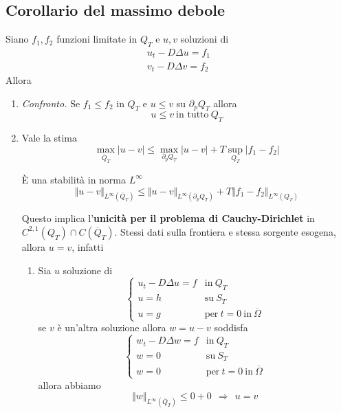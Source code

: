 \documentclass[10pt,a4paper,twoside,openright]{book}
\begin{document}
\subsection{Corollario del massimo debole}

Siano $f_{1},f_{2}$ funzioni limitate in $Q_{T}$ e $u,v$ soluzioni di
\begin{gather*}
u_{t} -D\Delta u=f_{1}\\
v_{t} -D\Delta v=f_{2}
\end{gather*}
Allora
\begin{enumerate}
\item \textit{Confronto.} Se $f_{1} \leqslant f_{2}$ in $Q_{T}$ e $u\leqslant v$ su $\partial _{p} Q_{T}$ allora\begin{equation*}
u\leqslant v\ \text{in tutto} \ Q_{T}
\end{equation*}
\item Vale la stima\begin{equation*}
\max_{\overline{Q}_{T}}| u-v| \leqslant \max_{\partial _{p} Q_{T}}| u-v| +T\sup _{Q_{T}}| f_{1} -f_{2}| 
\end{equation*}

È una stabilità in norma $L^{\infty }$\begin{equation*}
\Vert u-v\Vert _{L^{\infty }(\overline{Q}_{T})} \leqslant \Vert u-v\Vert _{L^{\infty }( \partial _{p} Q_{T})} +T\Vert f_{1} -f_{2}\Vert _{L^{\infty }(Q_{T})}
\end{equation*}

Questo implica l'\textbf{unicità per il problema di Cauchy-Dirichlet} in $C^{2,1}(Q_{T}) \cap C(\overline{Q}_{T})$. Stessi dati sulla frontiera e stessa sorgente esogena, allora $u=v$, infatti
\begin{enumerate}
\item Sia $u$ soluzione di\begin{equation*}
\begin{cases}
u_{t} -D\Delta u=f & \text{in} \ Q_{T}\\
u=h & \text{su} \ S_{T}\\
u=g & \text{per} \ t=0\ \text{in} \ \overline{\Omega }
\end{cases}
\end{equation*}se $v$ è un'altra soluzione allora $w=u-v$ soddisfa\begin{equation*}
\begin{cases}
w_{t} -D\Delta w=f & \text{in} \ Q_{T}\\
w=0 & \text{su} \ S_{T}\\
w=0 & \text{per} \ t=0\ \text{in} \ \overline{\Omega }
\end{cases}
\end{equation*}allora abbiamo\begin{equation*}
\Vert w\Vert _{L^{\infty }(\overline{Q}_{T})} \leqslant 0+0\ \ \Rightarrow \ \ u=v
\end{equation*}
\end{enumerate}
\end{enumerate}
\end{document}
